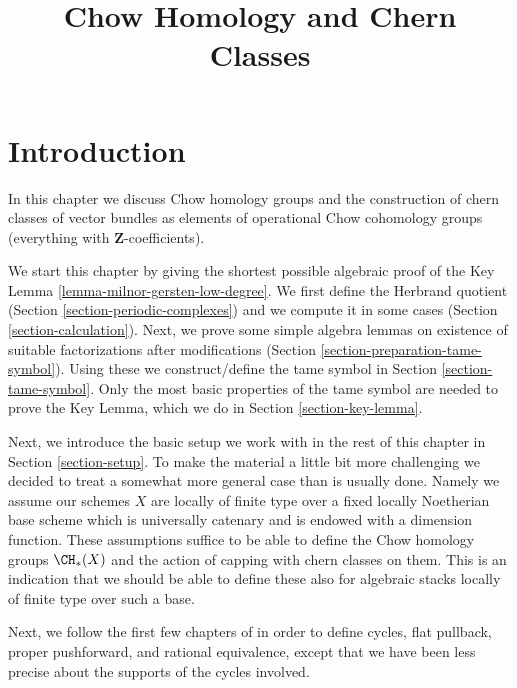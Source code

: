 

%


\title{Chow Homology and Chern Classes}

\maketitle

\label{section-phantom}


\tableofcontents


\section{Introduction}
\label{section-introduction}

\noindent
In this chapter we discuss Chow homology groups and the construction
of chern classes of vector bundles as elements of operational
Chow cohomology groups (everything with $\mathbf{Z}$-coefficients).

\medskip\noindent
We start this chapter by giving the shortest possible
algebraic proof of the Key Lemma \ref{lemma-milnor-gersten-low-degree}.
We first define the Herbrand quotient
(Section \ref{section-periodic-complexes})
and we compute it in some cases
(Section \ref{section-calculation}).
Next, we prove some simple algebra lemmas on
existence of suitable factorizations after modifications
(Section \ref{section-preparation-tame-symbol}).
Using these we construct/define the tame symbol in
Section \ref{section-tame-symbol}.
Only the most basic properties of the tame symbol
are needed to prove the Key Lemma, which we do
in Section \ref{section-key-lemma}.

\medskip\noindent
Next, we introduce the basic setup we work with in the rest of this
chapter in Section \ref{section-setup}. To make the material a little
bit more challenging we decided to treat a somewhat more general case
than is usually done. Namely we assume our schemes $X$ are locally of
finite type over a fixed locally Noetherian base scheme which is universally
catenary and is endowed with a dimension function. These assumptions suffice
to be able to define the Chow homology groups $\CH_*(X)$ and the action of
capping with chern classes on them. This is an indication that we should
be able to define these also for algebraic stacks locally of finite type
over such a base.

\medskip\noindent
Next, we follow the first few chapters of \cite{F} in order to define
cycles, flat pullback, proper pushforward, and rational equivalence,
except that we have been less precise about the supports of the cycles
involved.

